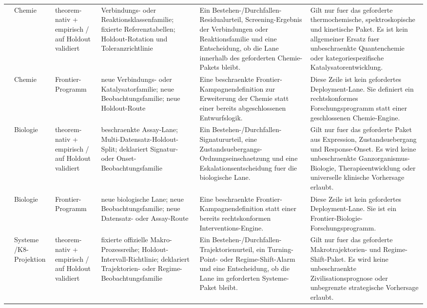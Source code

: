 \begin{longtable}{@{}L{0.13\textwidth}L{0.14\textwidth}L{0.12\textwidth}L{0.18\textwidth}L{0.17\textwidth}L{0.20\textwidth}@{}}
 & Chemie & theorem-nativ + empirisch / auf Holdout validiert & Verbindungs- oder Reaktionsklassenfamilie; \allowbreak fixierte Referenztabellen; \allowbreak Holdout-Rotation und Toleranzrichtlinie & Ein Bestehen-/Durchfallen-Residualurteil, Screening-Ergebnis der Verbindungen oder Reaktionsfamilie und eine Entscheidung, ob die Lane innerhalb des geforderten Chemie-Pakets bleibt. & Gilt nur fuer das geforderte thermochemische, spektroskopische und kinetische Paket. Es ist kein allgemeiner Ersatz fuer unbeschraenkte Quantenchemie oder kategoriespezifische Katalysatorentwicklung. \\
 & Chemie & Frontier-Programm & neue Verbindungs- oder Katalysatorfamilie; \allowbreak neue Beobachtungsfamilie; \allowbreak neue Holdout-Route & Eine beschraenkte Frontier-Kampagnendefinition zur Erweiterung der Chemie statt einer bereits abgeschlossenen Entwurfslogik. & Diese Zeile ist kein gefordertes Deployment-Lane. Sie definiert ein rechtskonformes Forschungsprogramm statt einer geschlossenen Chemie-Engine. \\
 & Biologie & theorem-nativ + empirisch / auf Holdout validiert & beschraenkte Assay-Lane; \allowbreak Multi-Datensatz-Holdout-Split; \allowbreak deklariert Signatur- oder Onset-Beobachtungsfamilie & Ein Bestehen-/Durchfallen-Signatururteil, eine Zustandsuebergangs-Ordnungseinschaetzung und eine Eskalationsentscheidung fuer die biologische Lane. & Gilt nur fuer das geforderte Paket aus Expression, Zustandsuebergang und Response-Onset. Es wird keine unbeschraenkte Ganzorganismus-Biologie, Therapieentwicklung oder universelle klinische Vorhersage erlaubt. \\
 & Biologie & Frontier-Programm & neue biologische Lane; \allowbreak neue Beobachtungsfamilie; \allowbreak neue Datensatz- oder Assay-Route & Eine beschraenkte Frontier-Kampagnendefinition statt einer bereits rechtskonformen Interventions-Engine. & Diese Zeile ist kein gefordertes Deployment-Lane. Sie ist ein Frontier-Biologie-Forschungsprogramm. \\
 & Systeme /\allowbreak K8-Projektion & theorem-nativ + empirisch / auf Holdout validiert & fixierte offizielle Makro-Prozessreihe; \allowbreak Holdout-Intervall-Richtlinie; \allowbreak deklariert Trajektorien- oder Regime-Beobachtungsfamilie & Ein Bestehen-/Durchfallen-Trajektorienurteil, ein Turning-Point- oder Regime-Shift-Alarm und eine Entscheidung, ob die Lane im geforderten Systeme-Paket bleibt. & Gilt nur fuer das geforderte Makrotrajektorien- und Regime-Shift-Paket. Es wird keine unbeschraenkte Zivilisationsprognose oder unbegrenzte strategische Vorhersage erlaubt. \\

\end{longtable}
